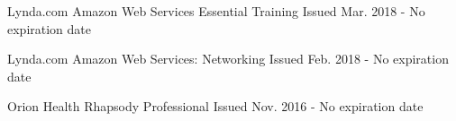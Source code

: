 \begin{cventries}

\cventry
{Lynda.com} %
{Amazon Web Services Essential Training} %
{} %
{Issued Mar. 2018 - No expiration date} %
{ %
}


\cventry
{Lynda.com} %
{Amazon Web Services: Networking} %
{} %
{Issued Feb. 2018 - No expiration date} %
{ %
}


\cventry
{Orion Health} %
{Rhapsody Professional} %
{} %
{Issued Nov. 2016 - No expiration date} %
{ %
}


\end{cventries}
